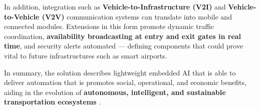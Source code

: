 In addition, integration such as \textbf{Vehicle-to-Infrastructure (V2I)} and \textbf{Vehicle-to-Vehicle (V2V)} communication systems can translate into mobile and connected modules.  
Extensions in this form promote dynamic traffic coordination, \textbf{availability broadcasting at entry and exit gates in real time}, and security alerts automated — defining components that could prove vital to future infrastructures such as smart airports.  

In summary, the solution describes lightweight embedded \ac{AI} that is able to deliver automation that is promotes social, operational, and economic benefits, aiding in the evolution of  \textbf{autonomous, intelligent, and sustainable transportation ecosystems} \cite{smart-parking, privacy-edge, nvidia-jetson}.